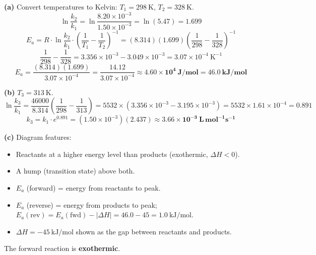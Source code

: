 \documentclass[addpoints]{exam}
\begin{document}
\begin{questions}
\begin{solution}[10cm]
\textbf{(a)} Convert temperatures to Kelvin: $T_1 = 298\ \text{K}$, $T_2 = 328\ \text{K}$.
\[
\ln\frac{k_2}{k_1} = \ln\frac{8.20\times10^{-3}}{1.50\times10^{-3}} = \ln(5.47) = 1.699
\]
\[
E_a = R \cdot \ln\frac{k_2}{k_1} \cdot \left(\frac{1}{T_1} - \frac{1}{T_2}\right)^{-1}
= (8.314)(1.699)\left(\frac{1}{298} - \frac{1}{328}\right)^{-1}
\]
\[
\frac{1}{298} - \frac{1}{328} = 3.356\times10^{-3} - 3.049\times10^{-3} = 3.07\times10^{-4}\ \text{K}^{-1}
\]
\[
E_a = \frac{(8.314)(1.699)}{3.07\times10^{-4}} = \frac{14.12}{3.07\times10^{-4}}
\approx \mathbf{4.60 \times 10^4\ J/mol = 46.0\ kJ/mol}
\]

\textbf{(b)} $T_3 = 313\ \text{K}$.
\[
\ln\frac{k_3}{k_1} = \frac{46000}{8.314}\left(\frac{1}{298} - \frac{1}{313}\right)
= 5532 \times (3.356\times10^{-3} - 3.195\times10^{-3}) = 5532 \times 1.61\times10^{-4} = 0.891
\]
\[
k_3 = k_1 \cdot e^{0.891} = (1.50\times10^{-3})(2.437) \approx \mathbf{3.66\times10^{-3}\ L\,mol^{-1}s^{-1}}
\]

\textbf{(c)} Diagram features:
\begin{itemize}
    \item Reactants at a higher energy level than products (exothermic, $\Delta H < 0$).
    \item A hump (transition state) above both.
    \item $E_a$ (forward) = energy from reactants to peak.
    \item $E_a$ (reverse) = energy from products to peak; $E_a(\text{rev}) = E_a(\text{fwd})
    - |\Delta H| = 46.0 - 45 = 1.0\ \text{kJ/mol}$.
    \item $\Delta H = -45\ \text{kJ/mol}$ shown as the gap between reactants and products.
\end{itemize}
The forward reaction is \textbf{exothermic}.
\end{solution}

\end{questions}
\end{document}
